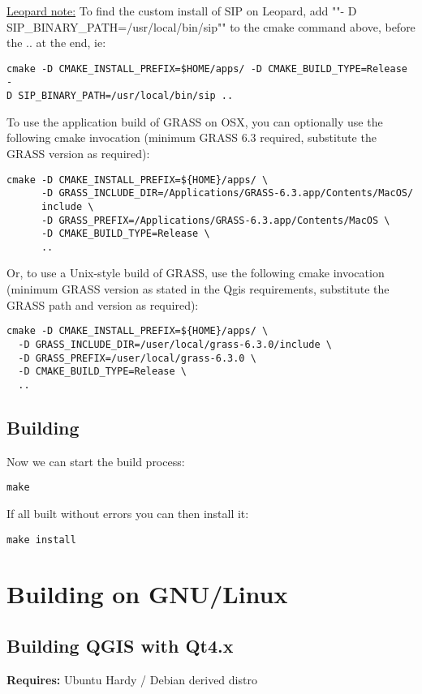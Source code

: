 \underline{Leopard note:} To find the custom install of SIP on Leopard, add ""-
D SIP\_BINARY\_PATH=/usr/local/bin/sip"" to the cmake command above,
before the .. at the end, ie:

\begin{verbatim}
cmake -D CMAKE_INSTALL_PREFIX=$HOME/apps/ -D CMAKE_BUILD_TYPE=Release -
D SIP_BINARY_PATH=/usr/local/bin/sip ..
\end{verbatim}

To use the application build of GRASS on OSX, you can optionally use the
following cmake invocation (minimum GRASS 6.3 required, substitute the GRASS
version as required):

\begin{verbatim}
cmake -D CMAKE_INSTALL_PREFIX=${HOME}/apps/ \
      -D GRASS_INCLUDE_DIR=/Applications/GRASS-6.3.app/Contents/MacOS/
      include \
      -D GRASS_PREFIX=/Applications/GRASS-6.3.app/Contents/MacOS \
      -D CMAKE_BUILD_TYPE=Release \
      ..
\end{verbatim}

Or, to use a Unix-style build of GRASS, use the following cmake invocation
(minimum GRASS version as stated in the Qgis requirements, substitute the GRASS
path and version as required):

\begin{verbatim}
cmake -D CMAKE_INSTALL_PREFIX=${HOME}/apps/ \
  -D GRASS_INCLUDE_DIR=/user/local/grass-6.3.0/include \
  -D GRASS_PREFIX=/user/local/grass-6.3.0 \
  -D CMAKE_BUILD_TYPE=Release \
  ..
\end{verbatim}

\subsection{Building}
Now we can start the build process:

\begin{verbatim}
make 
\end{verbatim}

If all built without errors you can then install it:

\begin{verbatim}
make install 
\end{verbatim}

\section{Building on GNU/Linux}\label{sec:install_linux}
\subsection{Building QGIS with Qt4.x}
\textbf{Requires:} Ubuntu Hardy / Debian derived distro

